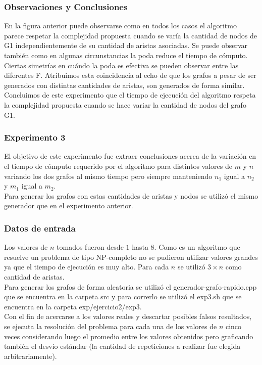 \subsubsection*{Observaciones y Conclusiones}\;
 \noindent En la figura anterior puede observarse como en todos los casos el algoritmo parece respetar la complejidad propuesta cuando se varía la cantidad de nodos de G1 independientemente de su cantidad de aristas asociadas. Se puede observar también como en algunas circunstancias la poda reduce el tiempo de cómputo.\\
Ciertas simetrías en cuándo la poda es efectiva se pueden observar entre las diferentes F. Atribuimos esta coincidencia al echo de que los grafos a pesar de ser generados con distintas cantidades de aristas, son generados de forma similar.\\
Concluimos de este experimento que el tiempo de ejecución del algoritmo respeta la complejidad propuesta cuando se hace variar la cantidad de nodos del grafo G1.
    
\subsubsection*{Experimento 3}\; 
 \noindent El objetivo de este experimento fue extraer conclusiones acerca de la variación en el tiempo de cómputo requerido por el algoritmo para distintos valores de $m$ y $n$ variando los dos grafos al mismo tiempo pero siempre manteniendo $n_1$ igual a $n_2$ y $m_1$ igual a $m_2$. \\
Para generar los grafos con estas cantidades de aristas y nodos se utilizó el mismo generador que en el experimento anterior. 
        
\subsubsection*{Datos de entrada}\;
\noindent Los valores de $n$ tomados fueron desde $1$ hasta $8$. Como es un algoritmo que resuelve un problema de tipo NP-completo no se pudieron utilizar valores grandes ya que el tiempo de ejecución es muy alto. Para cada $n$ se utilizó $3 \times n$ como cantidad de aristas.\\
        Para generar los grafos de forma aleatoria se utilizó el generador-grafo-rapido.cpp que se encuentra en la carpeta src y para correrlo se utilizó el exp3.sh que se encuentra en la carpeta exp/ejercicio2/exp3. \\
        Con el fin de acercarse a los valores reales y descartar posibles falsos resultados, se ejecuta la resolución del problema para cada una de los valores de $n$ cinco veces considerando luego el promedio entre los valores obtenidos pero graficando también el desvío estándar (la cantidad de repeticiones a realizar fue elegida arbitrariamente).\; 
        
